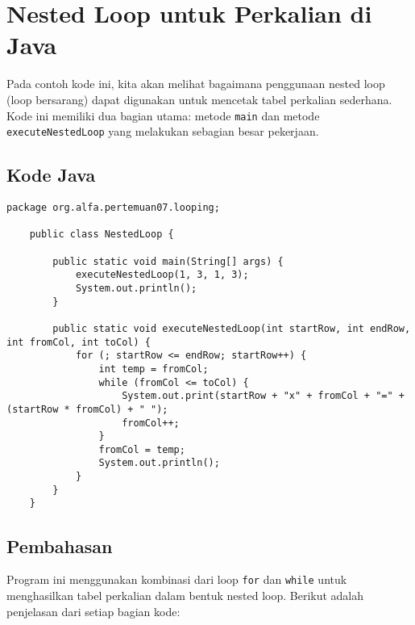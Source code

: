 \section{Nested Loop untuk Perkalian di Java}

Pada contoh kode ini, kita akan melihat bagaimana penggunaan nested loop (loop bersarang) dapat digunakan untuk mencetak tabel perkalian sederhana. Kode ini memiliki dua bagian utama: metode \texttt{main} dan metode \texttt{executeNestedLoop} yang melakukan sebagian besar pekerjaan.

\subsection{Kode Java}
\begin{lstlisting}[style=JavaStyle]
	package org.alfa.pertemuan07.looping;
	
	public class NestedLoop {
		
		public static void main(String[] args) {
			executeNestedLoop(1, 3, 1, 3);
			System.out.println();
		}
		
		public static void executeNestedLoop(int startRow, int endRow, int fromCol, int toCol) {
			for (; startRow <= endRow; startRow++) {
				int temp = fromCol;
				while (fromCol <= toCol) {
					System.out.print(startRow + "x" + fromCol + "=" + (startRow * fromCol) + " ");
					fromCol++;
				}
				fromCol = temp;
				System.out.println();
			}
		}
	}
\end{lstlisting}

\subsection{Pembahasan}
Program ini menggunakan kombinasi dari loop \texttt{for} dan \texttt{while} untuk menghasilkan tabel perkalian dalam bentuk nested loop. Berikut adalah penjelasan dari setiap bagian kode:

